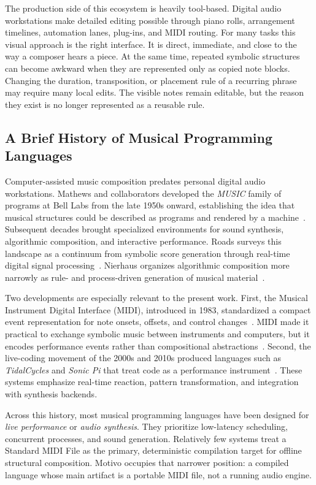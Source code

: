 The production side of this ecosystem is heavily tool-based.
Digital audio workstations make detailed editing possible through piano rolls, arrangement timelines, automation lanes,
plug-ins, and MIDI routing.
For many tasks this visual approach is the right interface.
It is direct, immediate, and close to the way a composer hears a piece.
At the same time, repeated symbolic structures can become awkward when they are represented only as copied note blocks.
Changing the duration, transposition, or placement rule of a recurring phrase may require many local edits.
The visible notes remain editable, but the reason they exist is no longer represented as a reusable rule.

\subsection{A Brief History of Musical Programming Languages}\label{subsec:musical-pl-history}

Computer-assisted music composition predates personal digital audio workstations.
Mathews and collaborators developed the \textit{MUSIC} family of programs at Bell Labs from the late 1950s onward,
establishing the idea that musical structures could be described as programs and rendered by a
machine~\cite{Roads_1996}.
Subsequent decades brought specialized environments for sound synthesis, algorithmic composition, and interactive
performance.
Roads surveys this landscape as a continuum from symbolic score generation through real-time digital signal
processing~\cite{Roads_1996}.
Nierhaus organizes algorithmic composition more narrowly as rule- and process-driven generation of musical
material~\cite{Nierhaus_2009}.

Two developments are especially relevant to the present work.
First, the Musical Instrument Digital Interface (MIDI), introduced in 1983, standardized a compact event representation
for note onsets, offsets, and control changes~\cite{Moog_1986}.
MIDI made it practical to exchange symbolic music between instruments and computers, but it encodes performance events
rather than compositional abstractions~\cite{Moore_1988}.
Second, the live-coding movement of the 2000s and 2010s produced languages such as \textit{TidalCycles} and
\textit{Sonic Pi} that treat code as a performance instrument~\cite{McLean_Wiggins_2010,Aaron_2016}.
These systems emphasize real-time reaction, pattern transformation, and integration with synthesis backends.

Across this history, most musical programming languages have been designed for \textit{live performance} or
\textit{audio synthesis}.
They prioritize low-latency scheduling, concurrent processes, and sound generation.
Relatively few systems treat a Standard MIDI File as the primary, deterministic compilation target for offline
structural composition.
Motivo occupies that narrower position: a compiled language whose main artifact is a portable MIDI file, not a running
audio engine.

